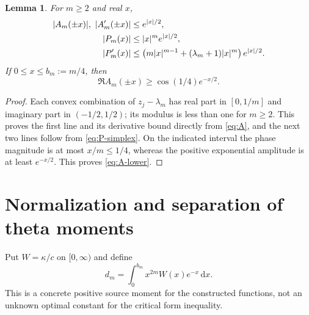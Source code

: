 \documentclass[11pt,a4paper]{article}
\newcommand{\abs}[1]{\lvert #1\rvert}
\newcommand{\dd}{\,\mathrm d}
\newtheorem{lemma}[theorem]{Lemma}
\theoremstyle{definition}
\theoremstyle{remark}
\numberwithin{equation}{section}
\begin{document}
\begin{lemma}\label{lem:amplitudes}
For $m\ge2$ and real $x$,
\begin{align}\label{eq:A-bounds}
 \abs{A_m(\pm x)},\ \abs{A_m'(\pm x)}&\le e^{\abs{x}/2},\notag\\
 \abs{P_m(x)}&\le\abs{x}^m e^{\abs{x}/2},\notag\\
 \abs{P_m'(x)}&\le
       \left(m\abs{x}^{m-1}+(\lambda_m+1)\abs{x}^m\right)e^{\abs{x}/2}.
\end{align}
If $0\le x\le b_m:=m/4$, then
\begin{equation}\label{eq:A-lower}
 \Re A_m(\pm x)\ge\cos(1/4)e^{-x/2}.
\end{equation}
\end{lemma}
\begin{proof}
Each convex combination of $z_j-\lambda_m$ has real part in $[0,1/m]$
and imaginary part in $(-1/2,1/2)$; its modulus is less than one for
$m\ge2$. This proves the first line and its derivative bound directly
from \eqref{eq:A}, and the next two lines follow from
\eqref{eq:P-simplex}. On the indicated interval the phase magnitude is
at most $x/m\le1/4$, whereas the positive exponential amplitude is at
least $e^{-x/2}$. This proves \eqref{eq:A-lower}.
\end{proof}

\section{Normalization and separation of theta moments}\label{sec:moments}

Put $W=\kappa/c$ on $[0,\infty)$ and define
\begin{equation}\label{eq:d}
 d_m=\int_0^{b_m}x^{2m}W(x)e^{-x}\dd x.
\end{equation}
This is a concrete positive source moment for the constructed functions,
not an unknown optimal constant for the critical form inequality.
\end{document}
